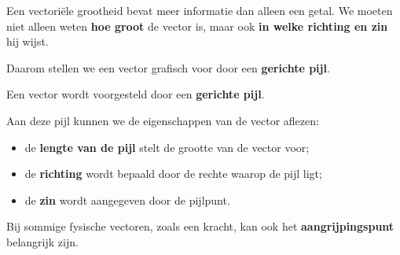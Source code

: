 \documentclass{ximera}
\begin{document}


Een vectoriële grootheid bevat meer informatie dan alleen een getal.
We moeten niet alleen weten \textbf{hoe groot} de vector is, maar ook
\textbf{in welke richting en zin} hij wijst.

Daarom stellen we een vector grafisch voor door een \textbf{gerichte pijl}.


\begin{definitie}

Een vector wordt voorgesteld door een \textbf{gerichte pijl}.

Aan deze pijl kunnen we de eigenschappen van de vector aflezen:

\begin{itemize}
    \item de \textbf{lengte van de pijl} stelt de grootte van de vector voor;
    \item de \textbf{richting} wordt bepaald door de rechte waarop de pijl ligt;
    \item de \textbf{zin} wordt aangegeven door de pijlpunt.
\end{itemize}

Bij sommige fysische vectoren, zoals een kracht, kan ook het
\textbf{aangrijpingspunt} belangrijk zijn.

\end{definitie}
\end{document}
